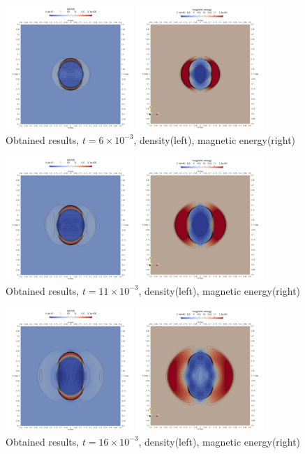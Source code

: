 \begin{figure}[H]
	\begin{center}
		\includegraphics[width=0.87\textwidth]{img//mhd-blast/old/mynew2.jpg}
	\caption{Obtained results, $t = 6\times 10^{-3}$, density(left), magnetic energy(right)}
	\label{figure:blastOldMy2}
	\end{center}
\end{figure}
\vspace{-8mm}

\begin{figure}[H]
	\begin{center}
		\includegraphics[width=0.87\textwidth]{img//mhd-blast/old/mynew3.jpg}
	\caption{Obtained results, $t = 11\times 10^{-3}$, density(left), magnetic energy(right)}
	\label{figure:blastOldMy3}
	\end{center}
\end{figure}
\vspace{-8mm}

\begin{figure}[H]
	\begin{center}
		\includegraphics[width=0.87\textwidth]{img//mhd-blast/old/mynew4.jpg}
	\caption{Obtained results, $t = 16\times 10^{-3}$, density(left), magnetic energy(right)}
	\label{figure:blastOldMy4}
	\end{center}
\end{figure}
\vspace{-8mm}

